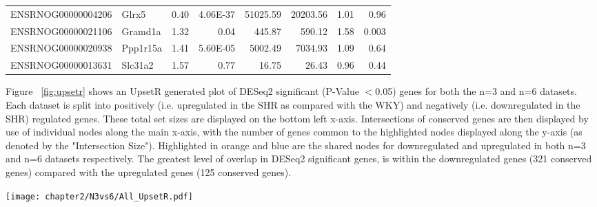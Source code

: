 \begin{sidewaystable}[!htbp]
\begin{tabular}{llrrrr|rr}
ENSRNOG00000004206 & Glrx5             & 0.40                          & 4.06E-37                    & 51025.59                   & 20203.56                   & 1.01  & 0.96\\
ENSRNOG00000021106 & Gramd1a           & 1.32                           & 0.04                        & 445.87                     & 590.12                     & 1.58  & 0.003\\
ENSRNOG00000020938 & Ppp1r15a          & 1.41                           & 5.60E-05                    & 5002.49                    & 7034.93                    & 1.09  & 0.64\\
ENSRNOG00000013631 & Slc31a2           & 1.57                           & 0.77                        & 16.75                      & 26.43                      & 0.96  & 0.44
\end{tabular}
\caption[Comparison of RNAseq Output with qPCR Validation on Candidate Biomarkers]{Comparison of RNAseq Output with qPCR Validation on Candidate Biomarkers. For each candidate gene, Ensembl Gene IDs are shown, alongside the DESeq2 raw output for \acrshort{dge} analysis. The full table has been amended to include; Fold Change (FC), P-Value (Benjamini-Hochberg Multiple test corrected), and mean counts for each group. Also displayed are the FC and associated P-Values for the qPCR analysis.}
\label{tab:n6RNAcandidates}
\end{sidewaystable}

Figure ~\ref{fig:upsetr} shows an UpsetR generated plot of DESeq2 significant (P-Value $<$0.05) genes for both the n=3 and n=6 datasets. Each dataset is split into positively (i.e. upregulated in the SHR as compared with the WKY) and negatively (i.e. downregulated in the SHR) regulated genes. These total set sizes are displayed on the bottom left x-axis. Intersections of conserved genes are then displayed by use of individual nodes along the main x-axis, with the number of genes common to the highlighted nodes displayed along the y-axis (as denoted by the "Intersection Size"). Highlighted in orange and blue are the shared nodes for downregulated and upregulated in both n=3 and n=6 datasets respectively. The greatest level of overlap in DESeq2 significant genes, is within the downregulated genes (321 conserved genes) compared with the upregulated genes (125 conserved genes). \\

\begin{figure*}[!htbp]
\centering
\texttt{[image: chapter2/N3vs6/All\_UpsetR.pdf]}
\caption[UpsetR Generated comparison of DESeq2 significant genes (P-Value$<$0.05) between n=3 and n=6 RNAseq]{UpsetR Generated comparison of DESeq2 significant genes (P-Value$<$0.05) between n=3 and n=6 RNAseq experiments; separated by direction of change. Total set sizes are displayed in the bottom left x-axis, and sets being compared are designated by highlighted nodes across the main x-axis. The number of genes individual to a set, or conserved across multiple are denoted by the nodes highlighted and the corresponding "Intersection Size" on the y-axis.}
\label{fig:upsetr}
\end{figure*}


